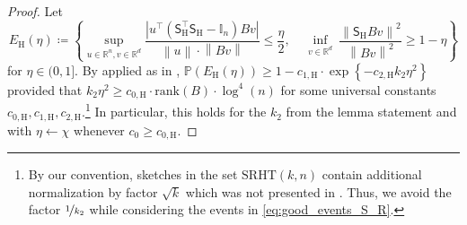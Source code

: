 \documentclass[11pt]{article}
\theoremstyle{definition}
\theoremstyle{plain}
\newcommand{\reals}{\mathbb{R}}
\providecommand{\brI}{\mathbb{I}}
\newcommand{\Norm}[1]{\left\| #1 \right\|}
\providecommand{\norm}[1]{\Norm{#1}}
\begin{document}
\begin{proof}
Let 
\begin{equation}
    \label{eq:good_events_S_R}
    E_{\mathrm{H}}(\eta) \coloneq \left\{\sup_{u \in \reals^{n}, v \in \reals^{d}} \frac{\left|u^{\top}\left(\mathsf{S}^{\top}_{\mathrm{H}}\mathsf{S}_{\mathrm{H}} - \brI_{n}\right) B v\right|}{\norm{u} \cdot \norm{B v}} \leq \frac{\eta}{2}, \ \ \ \ \ \underset{v\in \reals^{d}}{\inf} \ \frac{\norm{\mathsf{S}_{\mathrm{H}}Bv}^2}{\norm{Bv}^2} \geq 1 - \eta\right\}
\end{equation}
for $\eta \in (0, 1]$. By \citet[Lemma.~1]{pilanci_hessiansketch} applied as in \citet[Corollary.~2]{pilanci2015randomized}, $\mathbb{P}\left(E_{\mathrm{H}}(\eta)\right) \geq 1 - c_{1,\mathrm{H}}\cdot \exp\left\{-c_{2,\mathrm{H}}k_2\eta^2\right\}$ provided that $k_2\eta^2 \geq c_{0, \mathrm{H}}\cdot \mathrm{rank}\left(B\right)\cdot \log^4(n)$ for some universal constants $c_{0, \mathrm{H}}, c_{1,\mathrm{H}}, c_{2,\mathrm{H}}$.\footnote{By our convention, sketches in the set $\mathrm{SRHT}(k,n)$ contain additional normalization by factor $\sqrt{k}$ which was not presented in \citet{pilanci_hessiansketch}. Thus, we avoid the factor $\nicefrac{1}{k_2}$ while considering the events in \eqref{eq:good_events_S_R}.} In particular, this holds for the $k_2$ from the lemma statement and with $\eta \gets \chi$ whenever $c_0 \geq c_{0, \mathrm{H}}$.  


\end{proof}
\end{document}
